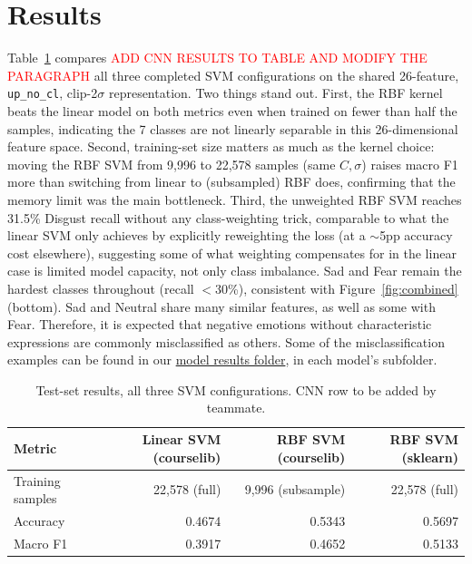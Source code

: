 \documentclass[10pt]{article}
\begin{document}
\section{Results}
\label{sec:results}
Table~\ref{tab:results} compares \textcolor{red}{ADD CNN RESULTS TO TABLE AND MODIFY THE PARAGRAPH} all three completed SVM configurations on the shared 26-feature, \texttt{up\_no\_cl}, clip-2$\sigma$ representation. Two things stand out. First, the RBF kernel beats the linear model on both metrics even when trained on fewer than half the samples, indicating the 7 classes are not linearly separable in this 26-dimensional feature space. Second, training-set size matters as much as the kernel choice: moving the RBF SVM from 9{,}996 to 22{,}578 samples (same $C,\sigma$) raises macro F1 more than switching from linear to (subsampled) RBF does, confirming that the memory limit was the main bottleneck. Third, the unweighted RBF SVM reaches 31.5\% Disgust recall without any class-weighting trick, comparable to what the linear SVM only achieves by explicitly reweighting the loss (at a $\sim$5pp accuracy cost elsewhere), suggesting some of what weighting compensates for in the linear case is limited model capacity, not only class imbalance. Sad and Fear remain the hardest classes throughout (recall $<$30\%), consistent with Figure~\ref{fig:combined} (bottom). Sad and Neutral share many similar features, as well as some with Fear. Therefore, it is expected that negative emotions without characteristic expressions are commonly misclassified as others. Some of the misclassification examples can be found in our \href{https://github.com/werka-z/emotion-recognition/tree/main/model_results}{model results folder}, in each model's subfolder.
\begin{table}[h]
\centering
\small
\begin{tabular}{lrrr}
\toprule
\textbf{Metric} & \textbf{Linear SVM (courselib)} & \textbf{RBF SVM (courselib)} & \textbf{RBF SVM (sklearn)}\\
\midrule
Training samples & 22{,}578 (full) & 9{,}996 (subsample) & 22{,}578 (full) \\
Accuracy  & 0.4674 & 0.5343 & 0.5697 \\
Macro F1  & 0.3917 & 0.4652 & 0.5133 \\
\bottomrule
\end{tabular}
\caption{\small Test-set results, all three SVM configurations. CNN row to be added by teammate.}
\label{tab:results}
\end{table}
\vspace{-0.5em}
\end{document}

